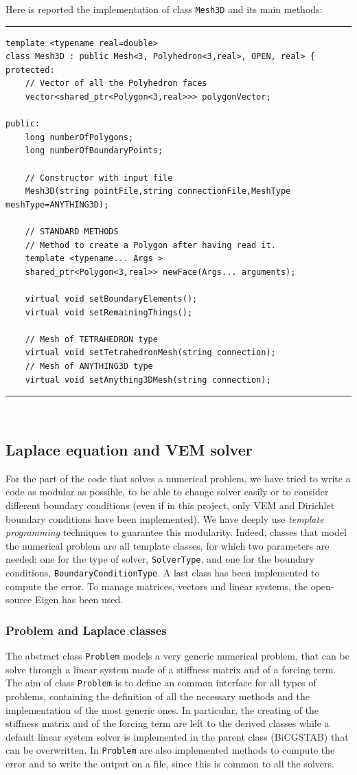 Here is reported the implementation of class \verb|Mesh3D| and its main methods:

\noindent\rule{12.7cm}{1pt}
\begin{verbatim}
template <typename real=double>
class Mesh3D : public Mesh<3, Polyhedron<3,real>, OPEN, real> {
protected:
    // Vector of all the Polyhedron faces
    vector<shared_ptr<Polygon<3,real>>> polygonVector;  

public:
    long numberOfPolygons;
    long numberOfBoundaryPoints;

    // Constructor with input file
    Mesh3D(string pointFile,string connectionFile,MeshType 
meshType=ANYTHING3D);
	
    // STANDARD METHODS
    // Method to create a Polygon after having read it.
    template <typename... Args >
    shared_ptr<Polygon<3,real>> newFace(Args... arguments);

    virtual void setBoundaryElements();
    virtual void setRemainingThings();

    // Mesh of TETRAHEDRON type
    virtual void setTetrahedronMesh(string connection);
    // Mesh of ANYTHING3D type
    virtual void setAnything3DMesh(string connection);
\end{verbatim}
\noindent\rule{12.7cm}{1pt}\\

\subsection{Laplace equation and VEM solver}
For the part of the code that solves a numerical problem, we have tried to write a code as modular as possible, to be able to change solver easily or to consider different boundary conditions (even if in this project, only VEM and Dirichlet boundary conditions have been implemented). We have deeply use \textit{template programming} techniques to guarantee this modularity. Indeed, classes that model the numerical problem are all template classes, for which two parameters are needed: one for the type of solver, \verb|SolverType|, and one for the boundary conditions, \verb|BoundaryConditionType|. A last class has been implemented to compute the error. To manage matrices, vectors and linear systems, the open-source Eigen has been used. 

\subsubsection{Problem and Laplace classes}
The abstract class \verb|Problem| models a very generic numerical problem, that can be solve through a linear system made of a stiffness matrix and of a forcing term. The aim of class \verb|Problem| is to define an common interface for all types of problems, containing the definition of all the necessary methods and the implementation of the most generic ones. In particular, the creating of the stiffness matrix and of the forcing term are left to the derived classes while a default linear system solver is implemented in the parent class (BiCGSTAB) that can be overwritten. In \verb|Problem| are also implemented methods to compute the error and to write the output on a file, since this is common to all the solvers. 

